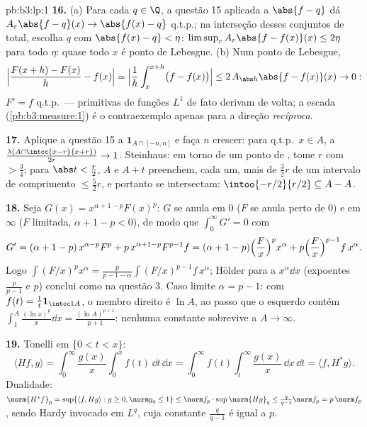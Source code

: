 \begin{solution}{pb:b3:lp:1}
\textbf{16.} (a) Para cada $q \in \Q$, a questão 15 aplicada a
$\abs{f - q}$ dá $A_r\abs{f - q}(x) \to \abs{f(x) - q}$
q.t.p.; na interseção desses conjuntos de  total, escolha
$q$ com $\abs{f(x) - q} < \eta$:
$\limsup_rA_r\abs{f - f(x)}(x) \leq 2\eta$ para todo $\eta$:
quase todo $x$ é ponto de Lebesgue. (b) Num ponto de Lebesgue,
\[
\Bigl|\frac{F(x + h) - F(x)}h - f(x)\Bigr|
= \Bigl|\frac1h\int_x^{x+h}\bigl(f - f(x)\bigr)\Bigr|
\leq 2\,A_{\abs h}\abs{f - f(x)}(x) \to 0 :
\]
$F' = f$ q.t.p.\ --- primitivas de funções $L^1$ de fato
derivam de volta; a escada (\cref{pb:b3:measure:1})
é o contraexemplo apenas para a direção \emph{recíproca}.

\textbf{17.} Aplique a questão 15 a $\mathbf 1_{A\cap[-n,n]}$
e faça $n$ crescer: para q.t.p.\ $x \in A$, a 
$\frac{\lambda(A\cap\intcc{x-r}{x+r})}{2r} \to 1$. Steinhaus:
em torno de um ponto de , tome $r$ com  $> \frac34$;
para $\abs t < \frac r2$, $A$ e $A + t$ preenchem, cada um, mais de
$\frac32r$ de um intervalo de comprimento $\leq \frac52r$, e portanto
se intersectam: $\intoo{-r/2}{r/2} \subseteq A - A$.

\textbf{18.} Seja $G(x) = x^{\alpha+1-p}F(x)^p$: $G$ se anula
em $0$ ($F$ se anula perto de $0$) e em $\infty$ ($F$ limitada,
$\alpha + 1 - p < 0$), de modo que $\int_0^\infty G' = 0$ com
\[
G' = (\alpha + 1 - p)\,x^{\alpha-p}F^p +
p\,x^{\alpha+1-p}F^{p-1}f
= (\alpha + 1 - p)\Bigl(\frac Fx\Bigr)^px^\alpha +
p\Bigl(\frac Fx\Bigr)^{p-1}f\,x^\alpha .
\]
Logo $\int(F/x)^px^\alpha = \frac{p}{p-1-\alpha}
\int(F/x)^{p-1}f\,x^\alpha$; Hölder para a 
$x^\alpha\dd x$ (expoentes $\frac p{p-1}$ e $p$) conclui
como na questão 3. Caso limite $\alpha = p - 1$: com $f(t) =
\frac1t\mathbf 1_{\intcc1A}$, o membro direito é $\ln A$,
ao passo que o esquerdo contém $\int_1^A\frac{(\ln x)^p}x\dd x =
\frac{(\ln A)^{p+1}}{p+1}$: nenhuma constante sobrevive a $A \to
\infty$.

\textbf{19.} Tonelli em $\{0 < t < x\}$:
\[
\langle Hf, g\rangle =
\int_0^\infty\frac{g(x)}x\int_0^xf(t)\,\dd t\,\dd x
= \int_0^\infty f(t)\int_t^\infty\frac{g(x)}x\,\dd x\,\dd t
= \langle f, H^*g\rangle .
\]
Dualidade: $\norm{H^*f}_p = \sup\{\langle f, Hg\rangle : g
\geq 0, \norm g_q \leq 1\} \leq \norm f_p\cdot
\sup\norm{Hg}_q \leq \frac q{q-1}\norm f_p = p\,\norm f_p$,
sendo Hardy invocado em $L^q$, cuja constante $\frac q{q-1}$
é igual a $p$.


\end{solution}
